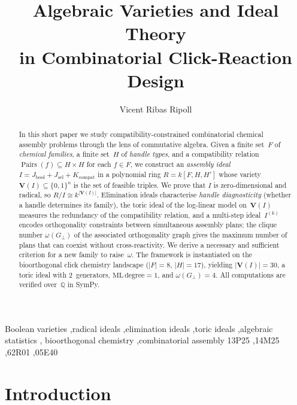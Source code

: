 \documentclass[preprint,12pt]{elsarticle}
\theoremstyle{definition}
\theoremstyle{remark}
\newcommand{\kk}{k}
\newcommand{\QQ}{\mathbb{Q}}
\newcommand{\Var}{\mathbf{V}}
\DeclareMathOperator{\Pairs}{Pairs}
\begin{document}
\begin{frontmatter}

\title{Algebraic Varieties and Ideal Theory\\
  in Combinatorial Click-Reaction Design}

\author[upc]{Vicent Ribas Ripoll}
\address[upc]{Barcelona, Spain}

\begin{abstract}
In this short paper we study compatibility-constrained combinatorial
chemical assembly problems through the lens of commutative algebra.
Given a finite set~$F$ of \emph{chemical families}, a finite
set~$H$ of \emph{handle types}, and
a compatibility relation $\Pairs(f) \subseteq H \times H$ for each
$f \in F$, we construct an \emph{assembly ideal}
$I = J_{\mathrm{bool}} + J_{\mathrm{sel}} + K_{\mathrm{compat}}$
in a polynomial ring $R = \kk[F, H, H']$ whose variety
$\Var(I) \subseteq \{0,1\}^n$ is the set of feasible triples.
We prove that $I$ is zero-dimensional and radical, so
$R/I \cong \kk^{|\Var(I)|}$.  Elimination ideals characterise
\emph{handle diagnosticity} (whether a handle determines its
family), the toric ideal of the log-linear model on~$\Var(I)$
measures the redundancy of the compatibility relation, and a
multi-step ideal~$I^{(k)}$ encodes orthogonality constraints
between simultaneous assembly plans; the clique number
$\omega(G_\perp)$ of the associated orthogonality graph gives
the maximum number of plans that can coexist without
cross-reactivity.  We derive a necessary and sufficient criterion
for a new family to raise~$\omega$.
The framework is instantiated on the bioorthogonal click chemistry
landscape ($|F| = 8$, $|H| = 17$), yielding
$|\Var(I)| = 30$, a toric ideal with 2~generators,
$\mathrm{ML\,degree} = 1$, and $\omega(G_\perp) = 4$.
All computations are verified over~$\QQ$ in SymPy.
\end{abstract}

\begin{keyword}
Boolean varieties \sep radical ideals \sep elimination ideals
\sep toric ideals \sep algebraic statistics \sep
bioorthogonal chemistry \sep combinatorial assembly
\MSC 13P25 \sep 14M25 \sep 62R01 \sep 05E40
\end{keyword}

\end{frontmatter}

\section{Introduction}\label{sec:intro}
\end{document}
